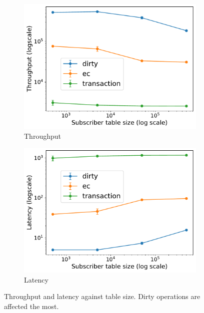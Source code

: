 \begin{figure}[htp]
  \centering
  \begin{subfigure}[t]{0.49\columnwidth}
    \centering
    \includegraphics[width=\columnwidth]{figures/tp_table_caelum.pdf}
    \caption{Throughput}
    \label{fig:tp table caelum}
  \end{subfigure}
  \begin{subfigure}[t]{0.49\columnwidth}
    \centering
    \includegraphics[width=\columnwidth]{figures/lat_table_caelum.pdf}
    \caption{Latency}
    \label{fig:lat table caelum}
  \end{subfigure}
  \caption{Throughput and latency against table size. Dirty operations are affected
  the most.}
  \label{fig:table caelum}
\end{figure}

